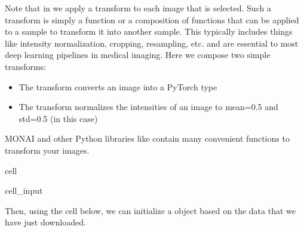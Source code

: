 \documentclass[letterpaper,10pt,english]{jupyterBook}
\begin{document}
\sphinxAtStartPar
Note that in  we apply a transform to each image that is selected. Such a transform is simply a function or a composition of functions that can be applied to a sample to transform it into another sample. This typically includes things like intensity normalization, cropping, resampling, etc. and are essential to most deep learning pipelines in medical imaging. Here we compose two simple transforms:
\begin{itemize}
\item {} 
\sphinxAtStartPar
The  transform converts an image into a PyTorch  type

\item {} 
\sphinxAtStartPar
The  transform normalizes the intensities of an image to mean=0.5 and std=0.5 (in this case)

\end{itemize}

\sphinxAtStartPar
MONAI and other Python libraries like  contain many convenient functions to transform your images.

\begin{sphinxuseclass}{cell}\begin{sphinxVerbatimInput}

\begin{sphinxuseclass}{cell_input}
\begin{sphinxVerbatim}[commandchars=\\\{\}]
   

  \PYG{p}{[}
    \PYG{p}{[}\PYG{p}{]} \PYG{p}{[}\PYG{p}{]}
\PYG{p}{]}
\end{sphinxVerbatim}

\end{sphinxuseclass}\end{sphinxVerbatimInput}

\end{sphinxuseclass}
\sphinxAtStartPar
Then, using the cell below, we can initialize a  object based on the data that we have just downloaded.
\end{document}
